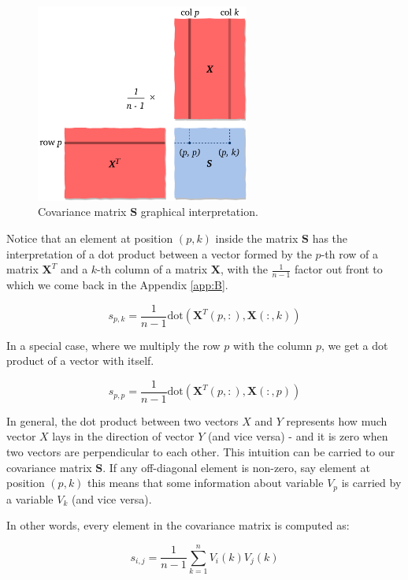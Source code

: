 \documentclass[10pt,twocolumn]{article}
\begin{document}
\begin{figure}[H]
\centering\includegraphics[width=7cm]{cov-matrix.png}
\caption{Covariance matrix $\bm{S}$ graphical interpretation.}
\label{fig:covariance-matrix}
\end{figure}

Notice that an element at position $(p,k)$ inside the matrix $\bm{S}$ has the interpretation of a dot product between a vector formed by the $p$-th row of a matrix $\bm{X}^T$ and a $k$-th column of a matrix $\bm{X}$, with the $\frac{1}{n-1}$ factor out front to which we come back in the Appendix \ref{app:B}.

\begin{equation}
s_{p,k} = \frac{1}{n-1} \text{dot}( \bm{X}^T(p, :), \bm{X}(:,k))
\end{equation}

In a special case, where we multiply the row $p$ with the column $p$, we get a dot product of a vector with itself.

\begin{equation}
s_{p,p} = \frac{1}{n-1} \text{dot}( \bm{X}^T(p, :), \bm{X}(:,p))
\end{equation}

In general, the dot product between two vectors $X$ and $Y$ represents how much vector $X$ lays in the direction of vector $Y$ (and vice versa) - and it is zero when two vectors are perpendicular to each other. This intuition can be carried to our covariance matrix $\bm{S}$. If any off-diagonal element is non-zero, say element at position $(p,k)$ this means that some information about variable $V_p$ is carried by a variable $V_k$ (and vice versa).

In other words, every element in the covariance matrix is computed as:

\begin{equation}
s_{i,j} = \frac{1}{n-1} \sum\limits_{k=1}^n V_i(k) V_j(k)
\end{equation}
\end{document}
